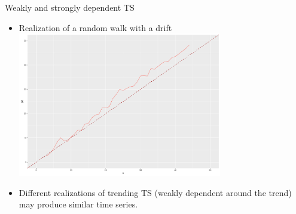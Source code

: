 \documentclass{beamer}
\begin{document}
\begin{frame}{Weakly and strongly dependent TS}
\begin{itemize}
\item Realization of a random walk with a drift \\ 
\vspace{0.2cm}
\includegraphics[width=0.7\textwidth]{img/random_walk_drift.pdf}
\item Different realizations of trending TS (weakly dependent around the trend) may produce similar time series.
\end{itemize}
\end{frame}
\end{document}
